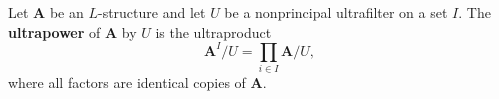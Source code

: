 Let $\mathbf{A}$ be an $L$-structure and let $U$ be a nonprincipal ultrafilter on a set $I$. The \textbf{ultrapower} of $\mathbf{A}$ by $U$ is the ultraproduct
$$\mathbf{A}^I / U = \prod_{i \in I} \mathbf{A} / U,$$
where all factors are identical copies of $\mathbf{A}$.
